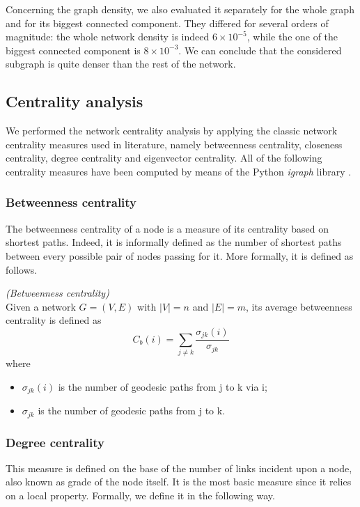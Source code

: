 \documentclass[sigchi]{acmart}
\begin{document}
Concerning the graph density, we also evaluated it separately for the whole graph and for its biggest connected component. They differed for several orders of magnitude: the whole network density is indeed $6 \times 10^{-5}$, while the one of the biggest connected component is $8 \times 10^{-3}$. We can conclude that the considered subgraph is quite denser than the rest of the network. 

\subsection{Centrality analysis}
We performed the network centrality analysis by applying the classic network centrality measures used in literature, namely betweenness centrality, closeness centrality, degree centrality and eigenvector centrality. All of the following centrality measures have been computed by means of the Python \textit{igraph} library \cite{csardi2006igraph}. 

\subsubsection{Betweenness centrality}
The betweenness centrality of a node is a measure of its centrality based on shortest paths. Indeed, it is informally defined as the number of shortest paths between every possible pair of nodes passing for it. More formally, it is defined as follows.

\begin{definition}
\textit{(Betweenness centrality)} \\
Given a network $G=(V, E)$ with $|V| = n$ and $|E| = m$, its average betweenness centrality is defined as 
$$ C_b(i) = \sum_{j \neq k} \frac{\sigma_{jk}(i)}{\sigma_{jk}}$$
where 
\begin{itemize}
    \item $\sigma_{jk}(i)$ is the number of geodesic paths from j to k via i;
    \item $\sigma_{jk}$ is the number of geodesic paths from j to k.
\end{itemize}
\end{definition}

\subsubsection{Degree centrality}
This measure is defined on the base of the number of links incident upon a node, also known as grade of the node itself. It is the most basic measure since it relies on a local property. Formally, we define it in the following way.
\end{document}

